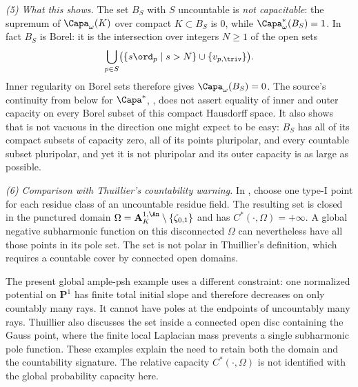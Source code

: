 \begin{example}
\emph{(5) What this shows.}  The set $B_S$ with $S$ uncountable is
\emph{not capacitable}: the supremum of $\Capa_\omega(K)$ over compact
$K\subset B_S$ is $0$, while $\Capa^*_\omega(B_S)=1$.  In fact $B_S$ is Borel: it is the intersection over integers $N\ge1$
of the open sets
\[
 \bigcup_{p\in S}\bigl(\{s\ord_p\mid s>N\}
                  \cup\{v_{p,\triv}\}\bigr).
\]
Inner regularity on Borel sets therefore gives
$\Capa_\omega(B_S)=0$. The source's continuity from below for
$\Capa^*$, \cite[Theorem~13.29]{BJ22}, does not assert equality of
inner and outer capacity on every Borel subset of this compact
Hausdorff space. It also
shows that  is not vacuous in the
direction one might expect to be easy: $B_S$ has all of its compact
subsets of capacity zero, all of its points pluripolar, and every countable
subset pluripolar, and yet it is not pluripolar and its outer capacity is
as large as possible.

\emph{(6) Comparison with Thuillier's countability warning.}
In \cite[Remarque~3.6.12]{Thu05}, choose one type-$\mathrm I$ point
for each residue class of an uncountable residue field. The resulting
set is closed in the punctured domain
$\Omega=\mathbf A^{1,\An}_K\setminus\{\zeta_{0,1}\}$ and has
$C^*(\cdot,\Omega)=+\infty$. A global negative subharmonic function
on this disconnected $\Omega$ can nevertheless have all those
points in its pole set. The set is not polar in Thuillier's definition,
which requires a countable cover by connected open domains.

The present global ample-psh example uses a different constraint:
one normalized potential on $\mathbf P^1$ has finite total initial
slope and therefore decreases on only countably many rays.
It cannot have poles at the endpoints of uncountably many rays.
Thuillier also discusses the set inside a connected open disc
containing the Gauss point, where the finite local Laplacian mass
prevents a single subharmonic pole function.
These examples explain the need to retain both the domain and the
countability signature. The relative capacity $C^*(\cdot,\Omega)$
is not identified with the global probability capacity here.

\end{example}

